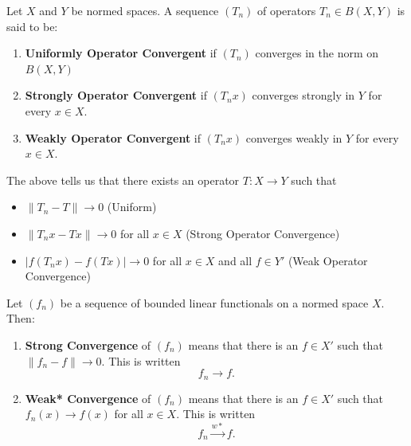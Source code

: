 \begin{definition}
    Let \( X  \) and \( Y  \) be normed spaces. A sequence \( ({T}_{n}) \) of operators \( {T}_{n} \in B(X,Y) \) is said to be:
    \begin{enumerate}
        \item[(1)] \textbf{Uniformly Operator Convergent} if \( ({T}_{n}) \) converges in the norm on \( B(X,Y) \)
        \item[(2)] \textbf{Strongly Operator Convergent} if \( ({T}_{n}x) \) converges strongly in \( Y  \) for every \( x \in X  \).
        \item[(3)] \textbf{Weakly Operator Convergent} if \( ({T}_{n}x) \) converges weakly in \( Y  \) for every \( x \in X  \).
    \end{enumerate}
\end{definition}

The above tells us that there exists an operator \( T: X \to Y  \) such that 
\begin{itemize}
    \item[(1)] \( \|{T}_{n} - T \| \longrightarrow 0  \) (Uniform)
    \item[(2)] \( \|{T}_{n}x - Tx\| \longrightarrow 0  \) for all \( x \in X  \) (Strong Operator Convergence)
    \item[(3)] \( | f({T}_{n}x) - f(Tx) | \longrightarrow 0   \) for all \( x \in X  \) and all \( f \in Y' \) (Weak Operator Convergence)
\end{itemize}

\begin{definition}
   Let \( ({f}_{n}) \) be a sequence of bounded linear functionals on a normed space \( X  \). Then:
   \begin{enumerate}
       \item[(a)] \textbf{Strong Convergence} of \( ({f}_{n}) \) means that there is an \( f \in X' \) such that \( \|{f}_{n} - f\| \longrightarrow 0  \). This is written
           \[  {f}_{n} \longrightarrow f.  \]
        \item[(b)] \textbf{Weak* Convergence} of \( ({f}_{n}) \) means that there is an \( f \in X' \) such that  \( {f}_{n}(x) \longrightarrow f(x) \) for all \( x \in X  \). This is written 
            \[  {f}_{n} \overset{w*}{\longrightarrow} f. \]
   \end{enumerate}
\end{definition}

